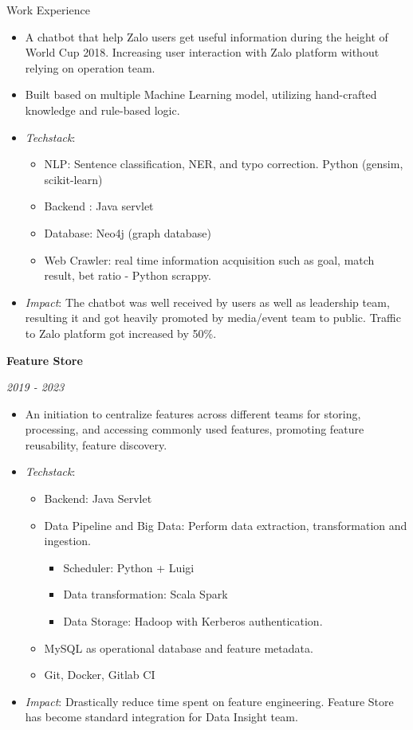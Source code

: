 \documentclass{resume} %
\begin{document}
\begin{rSection}{Work Experience}
{{\begin{itemize}
    \item A chatbot that help Zalo users get useful information during the height of World Cup 2018. Increasing user interaction with Zalo platform without relying on operation team.
    \item Built based on multiple Machine Learning model, utilizing hand-crafted knowledge and rule-based logic.
    \item \textit{Techstack}: 
    \begin{itemize}
            \item NLP: Sentence classification, NER, and typo correction. Python (gensim, scikit-learn)
            \item Backend : Java servlet
            \item Database: Neo4j (graph database)
            \item Web Crawler: real time information acquisition such as goal, match result, bet ratio - Python scrappy.
    \end{itemize}
    \item \textit{Impact}: The chatbot was well received by users as well as leadership team, resulting it and got heavily promoted by media/event team to public. Traffic to Zalo platform got increased by 50\%.
\end{itemize}

\newpage
\textbf{Feature Store} \hfill {\em \textit{2019 - 2023}
\begin{itemize}
    \item An initiation to centralize features across different teams for storing, processing, and accessing commonly used features, promoting feature reusability, feature discovery.
    \item \textit{Techstack}:
    \begin{itemize}
        \item Backend: Java Servlet
        \item Data Pipeline and Big Data: Perform data extraction, transformation and ingestion.
        \begin{itemize}
            \item Scheduler: Python + Luigi 
            \item Data transformation: Scala Spark 
            \item Data Storage: Hadoop with Kerberos authentication.
        \end{itemize}
        \item MySQL as operational database and feature metadata.
        \item Git, Docker, Gitlab CI
    \end{itemize} 
    \item \textit{Impact}: Drastically reduce time spent on feature engineering. Feature Store has become standard integration for Data Insight team. 
\end{itemize}


}}}
\end{rSection}
\end{document}

